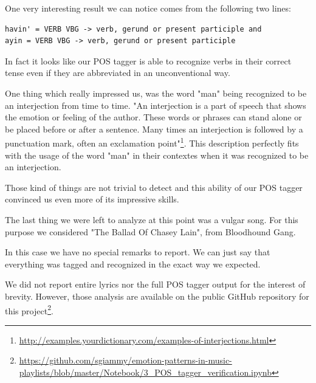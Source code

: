 One very interesting result we can notice comes from the following two lines:
\begin{lstlisting}
havin' = VERB VBG -> verb, gerund or present participle and
ayin = VERB VBG -> verb, gerund or present participle
\end{lstlisting}

In fact it looks like our POS tagger is able to recognize verbs in their correct tense
even if they are abbreviated in an unconventional way.

One thing which really impressed us, was the word "man" being recognized to be an interjection from time to time. 
"An interjection is a part of speech that shows the emotion or feeling of the author. These words or phrases can 
stand alone or be placed before or after a sentence. Many times an interjection is followed 
by a punctuation mark, often an exclamation point"\footnote{\url{http://examples.yourdictionary.com/examples-of-interjections.html}}. 
This description perfectly fits with the usage of the word "man" in their contextes when it was recognized to be an interjection. 

Those kind of things are not trivial to detect and this ability of our POS tagger convinced us even more
of its impressive skills.

The last thing we were left to analyze at this point was a vulgar song. For this purpose we considered 
"The Ballad Of Chasey Lain", from Bloodhound Gang. 

In this case we have no special remarks to report. We can just say that everything was tagged and
recognized in the exact way we expected.

We did not report entire lyrics nor the full POS tagger output for the interest of brevity. However, those
analysis are available on the public GitHub repository for this project\footnote{\url{https://github.com/sgiammy/emotion-patterns-in-music-playlists/blob/master/Notebook/3\_POS\_tagger\_verification.ipynb}}.